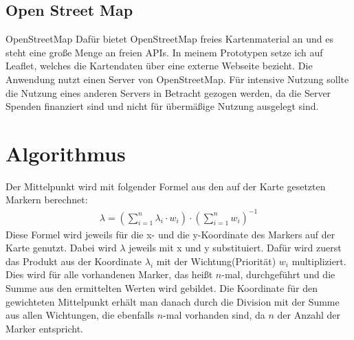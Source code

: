 \documentclass[a4paper, 12pt]{scrreprt}
\begin{document}
\section{Open Street Map}
OpenStreetMap\cite{osm2}
Dafür bietet OpenStreetMap freies Kartenmaterial an und es steht eine große Menge an freien APIs.
In meinem Prototypen setze ich auf Leaflet\cite{leaflet}, welches die Kartendaten über eine externe Webseite bezieht.
Die Anwendung nutzt einen Server von OpenStreetMap.
Für intensive Nutzung sollte die Nutzung eines anderen Servers in Betracht gezogen werden, da die Server Spenden finanziert sind und nicht für übermäßige Nutzung ausgelegt sind.\cite{osm}

\chapter{Algorithmus}
Der Mittelpunkt wird mit folgender Formel aus den auf der Karte gesetzten Markern berechnet:
\begin{eqnarray}
\lambda = \left(\sum_{i=1}^{n}\lambda_i \cdot w_i \right) \cdot \left(\sum_{i=1}^{n} w_i \right)^{-1}
\end{eqnarray}
Diese Formel wird jeweils für die x- und die y-Koordinate des Markers auf der Karte genutzt.
Dabei wird $\lambda$ jeweils mit x und y substituiert.
Dafür wird zuerst das Produkt aus der Koordinate $\lambda_i$ mit der Wichtung(Priorität) $w_i$ multipliziert.
Dies wird für alle vorhandenen Marker, das heißt $n$-mal, durchgeführt und die Summe aus den ermittelten Werten wird gebildet.
Die Koordinate für den gewichteten Mittelpunkt erhält man danach durch die Division mit der Summe aus allen Wichtungen, die ebenfalls $n$-mal vorhanden sind, da $n$ der Anzahl der Marker entspricht.
\end{document}
